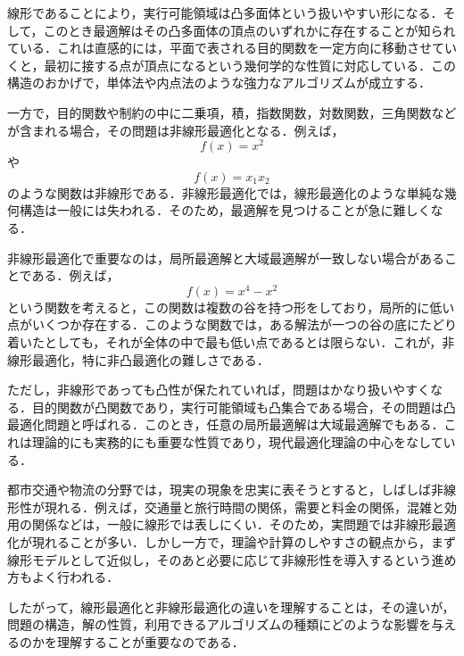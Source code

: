 線形であることにより，実行可能領域は凸多面体という扱いやすい形になる．そして，このとき最適解はその凸多面体の頂点のいずれかに存在することが知られている．これは直感的には，平面で表される目的関数を一定方向に移動させていくと，最初に接する点が頂点になるという幾何学的な性質に対応している．この構造のおかげで，単体法や内点法のような強力なアルゴリズムが成立する．


一方で，目的関数や制約の中に二乗項，積，指数関数，対数関数，三角関数などが含まれる場合，その問題は非線形最適化となる．例えば，
\begin{equation}
f(x)=x^2
\end{equation}
や
\begin{equation}
f(x)=x_1x_2
\end{equation}
のような関数は非線形である．非線形最適化では，線形最適化のような単純な幾何構造は一般には失われる．そのため，最適解を見つけることが急に難しくなる．

非線形最適化で重要なのは，局所最適解と大域最適解が一致しない場合があることである．例えば，
\begin{equation}
f(x)=x^4-x^2
\end{equation}
という関数を考えると，この関数は複数の谷を持つ形をしており，局所的に低い点がいくつか存在する．このような関数では，ある解法が一つの谷の底にたどり着いたとしても，それが全体の中で最も低い点であるとは限らない．これが，非線形最適化，特に非凸最適化の難しさである．

ただし，非線形であっても凸性が保たれていれば，問題はかなり扱いやすくなる．目的関数が凸関数であり，実行可能領域も凸集合である場合，その問題は凸最適化問題と呼ばれる．このとき，任意の局所最適解は大域最適解でもある．これは理論的にも実務的にも重要な性質であり，現代最適化理論の中心をなしている．

都市交通や物流の分野では，現実の現象を忠実に表そうとすると，しばしば非線形性が現れる．例えば，交通量と旅行時間の関係，需要と料金の関係，混雑と効用の関係などは，一般に線形では表しにくい．そのため，実問題では非線形最適化が現れることが多い．しかし一方で，理論や計算のしやすさの観点から，まず線形モデルとして近似し，そのあと必要に応じて非線形性を導入するという進め方もよく行われる．

したがって，線形最適化と非線形最適化の違いを理解することは，その違いが，問題の構造，解の性質，利用できるアルゴリズムの種類にどのような影響を与えるのかを理解することが重要なのである．





